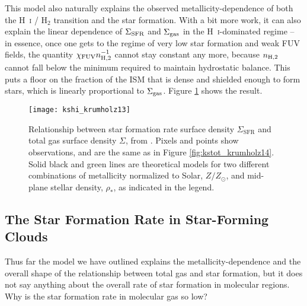 This model also naturally explains the observed metallicity-dependence of both the H~\textsc{i} / H$_2$ transition and the star formation. With a bit more work, it can also explain the linear dependence of $\Sigma_{\rm SFR}$ and $\Sigma_{\rm gas}$ in the H~\textsc{i}-dominated regime -- in essence, once one gets to the regime of very low star formation and weak FUV fields, the quantity $\chi_{\rm FUV} n_{\rm H,2}^{-1}$ cannot stay constant any more, because $n_{\rm H,2}$ cannot fall below the minimum required to maintain hydrostatic balance. This puts a floor on the fraction of the ISM that is dense and shielded enough to form stars, which is linearly proportional to $\Sigma_{\rm gas}$. Figure \ref{fig:kshi_krumholz13} shows the result.

\begin{figure}
\texttt{[image: kshi\_krumholz13]}
\caption[Theoretical model for metallicity-dependence of the star formation rate]{
\label{fig:kshi_krumholz13}
Relationship between star formation rate surface density $\Sigma_{\mathrm{SFR}}$ and total gas surface density $\Sigma$, from \citet{krumholz13c}. Pixels and points show observations, and are the same as in Figure \ref{fig:kstot_krumholz14}. Solid black and green lines are theoretical models for two different combinations of metallicity normalized to Solar, $Z/Z_\odot$, and mid-plane stellar density, $\rho_*$, as indicated in the legend.
}
\end{figure}

\subsection{The Star Formation Rate in Star-Forming Clouds}
\label{ssec:eff_th}

Thus far the model we have outlined explains the metallicity-dependence and the overall shape of the relationship between total gas and star formation, but it does not say anything about the overall rate of star formation in molecular regions. Why is the star formation rate in molecular gas so low?

